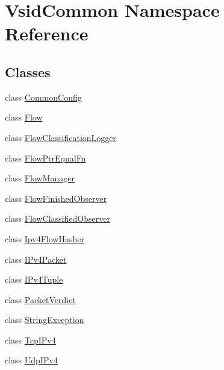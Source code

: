 \hypertarget{namespace_vsid_common}{\section{Vsid\-Common Namespace Reference}
\label{namespace_vsid_common}
}
\subsection*{Classes}
\begin{DoxyCompactItemize}
\item 
class \hyperlink{class_vsid_common_1_1_common_config}{Common\-Config}
\item 
class \hyperlink{class_vsid_common_1_1_flow}{Flow}
\item 
class \hyperlink{class_vsid_common_1_1_flow_classification_logger}{Flow\-Classification\-Logger}
\item 
class \hyperlink{class_vsid_common_1_1_flow_ptr_equal_fn}{Flow\-Ptr\-Equal\-Fn}
\item 
class \hyperlink{class_vsid_common_1_1_flow_manager}{Flow\-Manager}
\item 
class \hyperlink{class_vsid_common_1_1_flow_finished_observer}{Flow\-Finished\-Observer}
\item 
class \hyperlink{class_vsid_common_1_1_flow_classified_observer}{Flow\-Classified\-Observer}
\item 
class \hyperlink{class_vsid_common_1_1_ipv4_flow_hasher}{Ipv4\-Flow\-Hasher}
\item 
class \hyperlink{class_vsid_common_1_1_i_pv4_packet}{I\-Pv4\-Packet}
\item 
class \hyperlink{class_vsid_common_1_1_i_pv4_tuple}{I\-Pv4\-Tuple}
\item 
class \hyperlink{class_vsid_common_1_1_packet_verdict}{Packet\-Verdict}
\item 
class \hyperlink{class_vsid_common_1_1_string_exception}{String\-Exception}
\item 
class \hyperlink{class_vsid_common_1_1_tcp_i_pv4}{Tcp\-I\-Pv4}
\item 
class \hyperlink{class_vsid_common_1_1_udp_i_pv4}{Udp\-I\-Pv4}
\end{DoxyCompactItemize}
